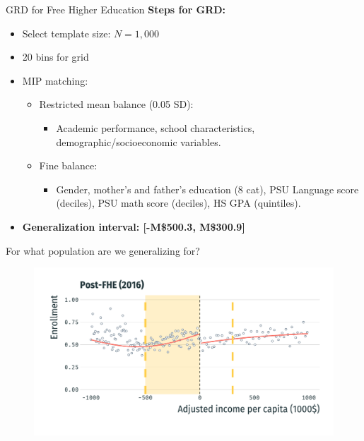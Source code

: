 \documentclass[usenames,dvipsnames,11pt,aspectratio=169]{beamer}
\begin{document}
\begin{frame}{GRD for Free Higher Education}
\textbf{Steps for GRD:}
\begin{itemize}
\item Select template size: $N=1,000$
\item 20 bins for grid
\item MIP matching:
\begin{itemize}
    \vspace{0.1cm}
\item Restricted mean balance (0.05 SD): 
\begin{itemize}
    \item Academic performance, school characteristics, demographic/socioeconomic variables.
\end{itemize}
    \vspace{0.1cm}
\item Fine balance: 
\begin{itemize}
    \item Gender, mother's and father's education (8 cat), PSU Language score (deciles), PSU math score (deciles), HS GPA (quintiles).
\end{itemize}
\end{itemize}
    \vspace{0.1cm}
\item \textbf{Generalization interval: [-M\$500.3, M\$300.9]}
\end{itemize}
\end{frame}


\begin{frame}{For what population are we generalizing for?}
\begin{figure}[!htb]
\centering
    \includegraphics[width=\textwidth]{figures/fhe_post_bw_cover.pdf}
\end{figure}
\end{frame}
\end{document}
